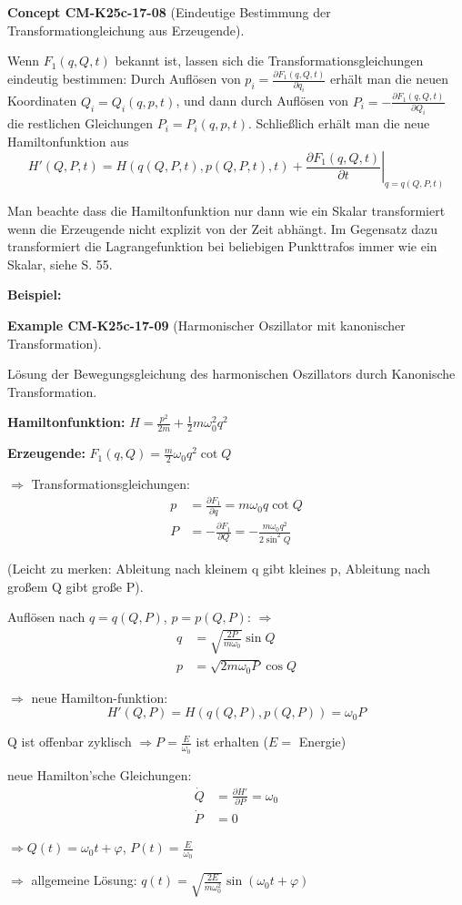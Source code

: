 \documentclass[10pt, letterpaper]{article}
\newcommand{\CustomHeading}[3]{%
  \par\medskip\noindent%
  \textbf{#1 #2} \textnormal{(#3)}.\enskip%
}
\newenvironment{EXA}[2]{\begin{unitbox}\CustomHeading{Example}{#1}{#2}}{\end{unitbox}}
\newenvironment{CONC}[2]{\begin{unitbox}\CustomHeading{Concept}{#1}{#2}}{\end{unitbox}}
\begin{document}
\begin{CONC}{CM-K25c-17-08}{Eindeutige Bestimmung der Transformationgleichung aus Erzeugende}
Wenn $F_1(q,Q,t)$ bekannt ist, lassen sich die Transformationsgleichungen eindeutig bestimmen: Durch Auflösen von $p_i = \frac{\partial F_1(q,Q,t)}{\partial q_i}$ erhält man die neuen Koordinaten $Q_i = Q_i(q,p,t)$, und dann durch Auflösen von $P_i = -\frac{\partial F_1(q,Q,t)}{\partial Q_i}$ die restlichen Gleichungen $P_i = P_i(q,p,t)$. Schließlich erhält man die neue Hamiltonfunktion aus
\[H'(Q,P,t) = H(q(Q,P,t),p(Q,P,t),t) + \left.\frac{\partial F_1(q,Q,t)}{\partial t}\right|_{q=q(Q,P,t)}\]

Man beachte dass die Hamiltonfunktion nur dann wie ein Skalar transformiert wenn die Erzeugende nicht explizit von der Zeit abhängt. Im Gegensatz dazu transformiert die Lagrangefunktion bei beliebigen Punkttrafos immer wie ein Skalar, siehe S. 55.
\end{CONC}





\textbf{Beispiel:} 


\begin{EXA}{CM-K25c-17-09}{Harmonischer Oszillator mit kanonischer Transformation}
Lösung der Bewegungsgleichung des harmonischen Oszillators durch Kanonische Transformation.

\textbf{Hamiltonfunktion:} $H = \frac{p^2}{2m} + \frac{1}{2}m\omega_0^2q^2$

\textbf{Erzeugende:} $F_1(q,Q) = \frac{m}{2}\omega_0q^2\cot Q$

$\Rightarrow$ Transformationsgleichungen:
\begin{align*}
p &= \frac{\partial F_1}{\partial q} = m\omega_0q\cot Q\\
P &= -\frac{\partial F_1}{\partial Q} = -\frac{m\omega_0q^2}{2\sin^2 Q}
\end{align*}

(Leicht zu merken: Ableitung nach kleinem q gibt kleines p, Ableitung nach großem Q gibt große P).

Auflösen nach $q = q(Q,P)$, $p = p(Q,P)$: $\Rightarrow$
\begin{align*}
q &= \sqrt{\frac{2P}{m\omega_0}}\sin Q\\
p &= \sqrt{2m\omega_0P}\cos Q
\end{align*}

$\Rightarrow$ neue Hamilton-funktion:
\[H'(Q,P) = H(q(Q,P), p(Q,P)) = \omega_0P\]

Q ist offenbar zyklisch $\Rightarrow P = \frac{E}{\omega_0}$ ist erhalten ($E = $ Energie)

neue Hamilton'sche Gleichungen:
\begin{align*}
\dot{Q} &= \frac{\partial H'}{\partial P} = \omega_0\\
\dot{P} &= 0
\end{align*}

$\Rightarrow Q(t) = \omega_0t + \varphi$, $P(t) = \frac{E}{\omega_0}$

$\Rightarrow$ allgemeine Lösung: $q(t) = \sqrt{\frac{2E}{m\omega_0^2}}\sin(\omega_0t + \varphi)$
\end{EXA}
\end{document}
